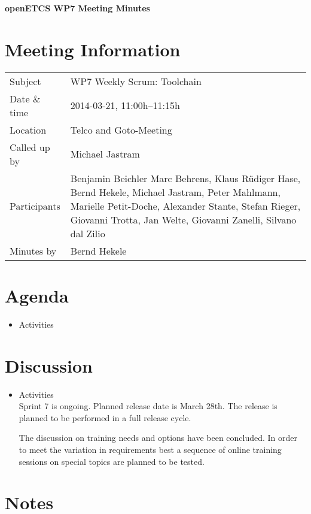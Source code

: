 \documentclass[a4paper, 11pt]{article}
\begin{document}
{\begin{center}\huge\bf openETCS WP7 Meeting Minutes\end{center}}
\section{Meeting Information}

\renewcommand{\arraystretch}{1.5}
\begin{supertabular}{m{.2\textwidth}m{.8\textwidth}}
Subject & WP7 Weekly Scrum: Toolchain\\
Date \& time & 2014-03-21, 11:00h--11:15h\\
Location & Telco and Goto-Meeting\\
Called up by & Michael Jastram\\
Participants &
Benjamin Beichler
Marc Behrens,
Klaus R\"udiger Hase,
Bernd Hekele,
Michael Jastram,
Peter Mahlmann,
Marielle Petit-Doche,
Alexander Stante,
Stefan Rieger,
Giovanni Trotta,
Jan Welte,
Giovanni Zanelli,
Silvano dal Zilio
\\

Minutes by & Bernd Hekele\\

\end{supertabular}
\renewcommand{\arraystretch}{1.0}


\section{Agenda}
\begin{itemize}
\item Activities
\end{itemize}

\section{Discussion}

\begin{itemize}
\item Activities\\
Sprint 7 is ongoing. Planned release date is March 28th. The release is planned to be performed in a full release cycle.

The discussion on training needs and options have been concluded. In order to meet the variation in requirements best a sequence of online training sessions  on special topics are planned to be tested.

\end{itemize}

\section{Notes}
\end{document}
